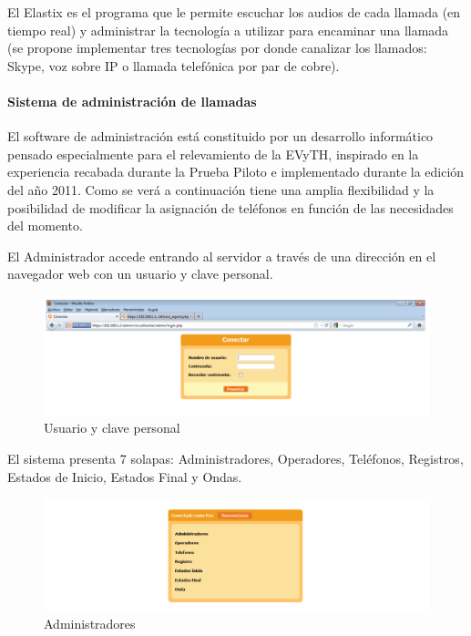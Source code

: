 \documentclass[
  openany]{book}
\begin{document}
El Elastix es el programa que le permite escuchar los audios de cada llamada (en tiempo real) y administrar la tecnología a utilizar para encaminar una llamada (se propone implementar tres tecnologías por donde canalizar los llamados: Skype, voz sobre IP o llamada telefónica por par de cobre).

\hypertarget{sistema-de-administraciuxf3n-de-llamadas}{%
\paragraph{Sistema de administración de llamadas}\label{sistema-de-administraciuxf3n-de-llamadas}}

El software de administración está constituido por un desarrollo informático pensado especialmente para el relevamiento de la EVyTH, inspirado en la experiencia recabada durante la Prueba Piloto e implementado durante la edición del año 2011. Como se verá a continuación tiene una amplia flexibilidad y la posibilidad de modificar la asignación de teléfonos en función de las necesidades del momento.

El Administrador accede entrando al servidor a través de una dirección en el navegador web con un usuario y clave personal.

\begin{figure}

{\centering \includegraphics[width=1\linewidth]{imagenes/figura6-01} 

}

\caption{Usuario y clave personal}\label{fig:conectar}
\end{figure}

El sistema presenta 7 solapas: Administradores, Operadores, Teléfonos, Registros, Estados de Inicio, Estados Final y Ondas.

\begin{figure}

{\centering \includegraphics[width=1\linewidth]{imagenes/figura6-02} 

}

\caption{Administradores}\label{fig:Adm}
\end{figure}
\end{document}
